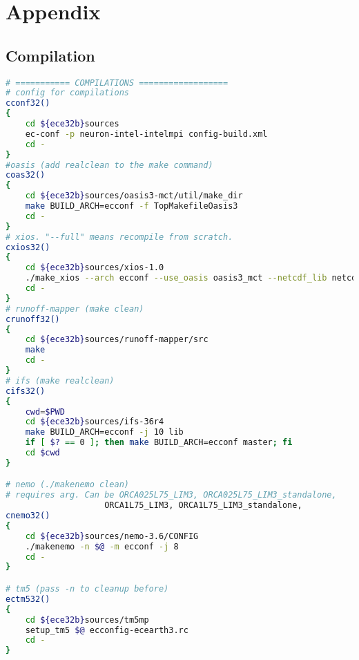 


\appendix
\chapter{Appendix}
\section{Compilation}

\begin{lstlisting}[caption={Compilation functions},label={app:comp},language=Bash]
# =========== COMPILATIONS ==================
# config for compilations
cconf32()
{
    cd ${ece32b}sources
    ec-conf -p neuron-intel-intelmpi config-build.xml
    cd -
}
#oasis (add realclean to the make command)
coas32()
{
    cd ${ece32b}sources/oasis3-mct/util/make_dir
    make BUILD_ARCH=ecconf -f TopMakefileOasis3
    cd -
}
# xios. "--full" means recompile from scratch.
cxios32()
{
    cd ${ece32b}sources/xios-1.0
    ./make_xios --arch ecconf --use_oasis oasis3_mct --netcdf_lib netcdf4_seq --full --job 8
    cd -
}
# runoff-mapper (make clean)
crunoff32()
{
    cd ${ece32b}sources/runoff-mapper/src
    make
    cd -
}
# ifs (make realclean)
cifs32()
{
    cwd=$PWD 
    cd ${ece32b}sources/ifs-36r4
    make BUILD_ARCH=ecconf -j 10 lib
    if [ $? == 0 ]; then make BUILD_ARCH=ecconf master; fi
    cd $cwd
}

# nemo (./makenemo clean)
# requires arg. Can be ORCA025L75_LIM3, ORCA025L75_LIM3_standalone, 
                    ORCA1L75_LIM3, ORCA1L75_LIM3_standalone,
cnemo32()
{
    cd ${ece32b}sources/nemo-3.6/CONFIG
    ./makenemo -n $@ -m ecconf -j 8
    cd -
} 

# tm5 (pass -n to cleanup before)
ectm532()
{
    cd ${ece32b}sources/tm5mp
    setup_tm5 $@ ecconfig-ecearth3.rc
    cd -
}
\end{lstlisting}


